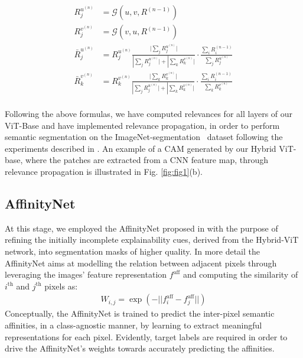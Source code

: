 \begin{align*}
    R_j^{{u}^{(n)}} &= \mathcal{G}(u, v, R^{(n-1)})  \\
    R_j^{{v}^{(n)}} &= \mathcal{G}(v, u, R^{(n-1)})  \\
    \bar{R}_j^{{u}^{(n)}} &= R_j^{{u}^{(n)}} \frac{ |\sum_{j}{R_j^{{u}^{(n)}}|}}{|\sum_{j} {R_j^{{u}^{(n)}}|} + |\sum_{k}{R_k^{{v}^{(n)}}|}}  \cdot \frac{\sum_{i}{R_i^{(n-1)}}}{\sum_{j}{R_j^{{u}^{(n)}}}} \\
    \bar{R}_k^{{v}^{(n)}} &= R_k^{{v}^{(n)}} \frac{ |\sum_{k}{R_k^{{v}^{(n)}}|}}{|\sum_{j} {R_j^{{u}^{(n)}}|} + |\sum_{k}{R_k^{{v}^{(n)}}|}}  \cdot \frac{\sum_{i}{R_i^{(n-1)}}}{\sum_{k}{R_k^{{v}^{(n)}}}} \\
\end{align*} 	

       
Following the above formulas, we have computed relevances for all layers of our ViT-Base and have implemented relevance propagation, in order to perform semantic segmentation on the ImageNet-segmentation~\cite{imagenet-seg} dataset following the experiments described in \cite{mainpaper}. An example of a CAM generated by our Hybrid ViT-base, where the patches are extracted from a CNN feature map, through relevance propagation is illustrated in Fig. \ref{fig:fig1}(b).

\subsection{AffinityNet}
\label{sub:3.3}
At this stage, we employed the AffinityNet proposed in \cite{ahn2018learning} with the purpose of refining the initially incomplete explainability cues, derived from the Hybrid-ViT network, into segmentation masks of higher quality. In more detail the AffinityNet aims at modelling the relation between adjacent pixels through leveraging the images' feature representation $f^\text{aff}$ and computing the similarity of $i^\text{th}$ and $j^\text{th}$ pixels as:
\begin{align*}
W_{i,j}=\exp(-||{f_i^\text{aff}-f_j^\text{aff}}||)
\end{align*}
Conceptually, the AffinityNet is trained to predict the inter-pixel semantic affinities, in a class-agnostic manner, by learning to extract meaningful representations for each pixel. Evidently, target labels are required in order to drive the AffinityNet's weights towards accurately predicting the affinities.

